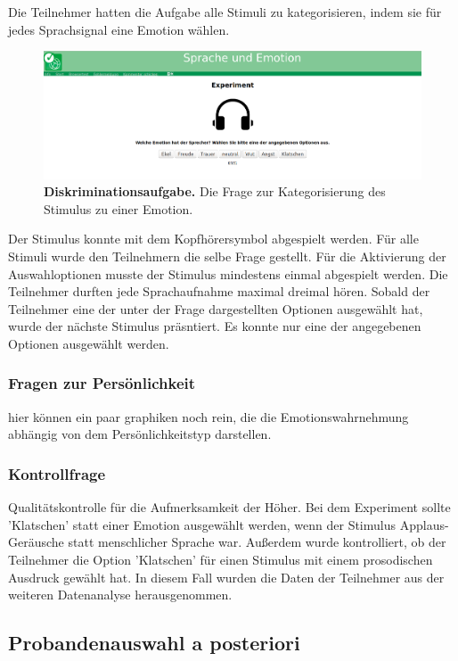 \documentclass[11pt,a4paper,headsepline,twoside,toc=bibliography]{scrreprt}
\begin{document}
Die Teilnehmer hatten die Aufgabe alle Stimuli zu kategorisieren, indem sie für jedes Sprachsignal eine Emotion wählen. 
\begin{figure}
	\centering
	\includegraphics[width=1\linewidth]{pics/experiment/experiment_active_buttons.png}
	\caption{\textbf{Diskriminationsaufgabe.} Die Frage zur Kategorisierung des Stimulus zu einer Emotion. }
	\label{fig:experiment_question}
\end{figure}


 Der Stimulus konnte mit dem Kopfhörersymbol abgespielt werden. Für alle Stimuli wurde den Teilnehmern die selbe Frage gestellt. Für die Aktivierung der Auswahloptionen musste der Stimulus mindestens einmal abgespielt werden. Die Teilnehmer durften jede Sprachaufnahme maximal dreimal hören. Sobald der Teilnehmer eine der unter der Frage dargestellten Optionen ausgewählt hat, wurde der nächste Stimulus präsntiert. Es konnte nur eine der angegebenen Optionen ausgewählt werden.
 
\subsubsection{Fragen zur Persönlichkeit}

hier können ein paar graphiken noch rein, die die Emotionswahrnehmung abhängig von dem Persönlichkeitstyp darstellen.

\subsubsection{Kontrollfrage}
Qualitätskontrolle für die Aufmerksamkeit der Höher. Bei dem Experiment sollte 'Klatschen' statt einer Emotion ausgewählt werden, wenn der Stimulus Applaus-Geräusche statt menschlicher Sprache war. Außerdem wurde kontrolliert, ob der Teilnehmer die Option 'Klatschen' für einen Stimulus mit einem prosodischen Ausdruck gewählt hat. In diesem Fall wurden die Daten der Teilnehmer aus der weiteren Datenanalyse herausgenommen.

\subsection{Probandenauswahl a posteriori}
\end{document}
